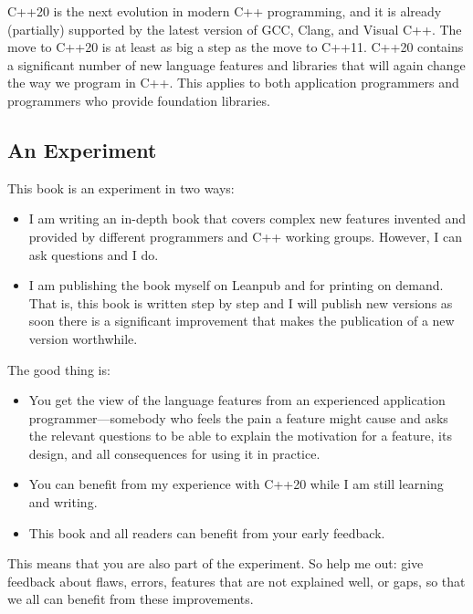 
C++20 is the next evolution in modern C++ programming, and it is already (partially) supported by the latest version of GCC, Clang, and Visual C++. The move to C++20 is at least as big a step as the move to C++11. C++20 contains a significant number of new language features and libraries that will again change the way we program in C++. This applies to both application programmers and programmers who provide foundation libraries.

\subsection*{An Experiment}

This book is an experiment in two ways:

\begin{itemize}
\item
I am writing an in-depth book that covers complex new features invented and provided by different programmers and C++ working groups. However, I can ask questions and I do.

\item
I am publishing the book myself on Leanpub and for printing on demand. That is, this book is written step by step and I will publish new versions as soon there is a significant improvement that makes the publication of a new version worthwhile.
\end{itemize}

The good thing is:

\begin{itemize}
\item
You get the view of the language features from an experienced application programmer—somebody who feels the pain a feature might cause and asks the relevant questions to be able to explain the motivation for a feature, its design, and all consequences for using it in practice.

\item
You can benefit from my experience with C++20 while I am still learning and writing.

\item
This book and all readers can benefit from your early feedback.
\end{itemize}

This means that you are also part of the experiment. So help me out: give feedback about flaws, errors, features that are not explained well, or gaps, so that we all can benefit from these improvements.

